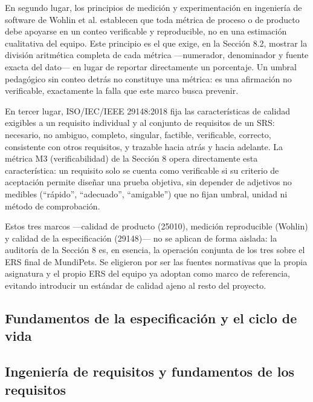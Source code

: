 \documentclass[journal,onecolumn]{IEEEtran}
\begin{document}
	En segundo lugar, los principios de medición y experimentación en ingeniería de software de Wohlin et al. \cite{wohlin2012} establecen que toda métrica de proceso o de producto debe apoyarse en un conteo verificable y reproducible, no en una estimación cualitativa del equipo. Este principio es el que exige, en la Sección 8.2, mostrar la división aritmética completa de cada métrica ---numerador, denominador y fuente exacta del dato--- en lugar de reportar directamente un porcentaje. Un umbral pedagógico sin conteo detrás no constituye una métrica: es una afirmación no verificable, exactamente la falla que este marco busca prevenir.
	
	En tercer lugar, ISO/IEC/IEEE 29148:2018 \cite{ieee29148} fija las características de calidad exigibles a un requisito individual y al conjunto de requisitos de un SRS: necesario, no ambiguo, completo, singular, factible, verificable, correcto, consistente con otros requisitos, y trazable hacia atrás y hacia adelante. La métrica M3 (verificabilidad) de la Sección 8 opera directamente esta característica: un requisito solo se cuenta como verificable si su criterio de aceptación permite diseñar una prueba objetiva, sin depender de adjetivos no medibles (``rápido'', ``adecuado'', ``amigable'') que no fijan umbral, unidad ni método de comprobación.
	
	Estos tres marcos ---calidad de producto (25010), medición reproducible (Wohlin) y calidad de la especificación (29148)--- no se aplican de forma aislada: la auditoría de la Sección 8 es, en esencia, la operación conjunta de los tres sobre el ERS final de MundiPets. Se eligieron por ser las fuentes normativas que la propia asignatura y el propio ERS del equipo ya adoptan como marco de referencia, evitando introducir un estándar de calidad ajeno al resto del proyecto.
	
	\subsection*{Fundamentos de la especificación y el ciclo de vida}
	\subsection*{Ingeniería de requisitos y fundamentos de los requisitos}
	
\end{document}
